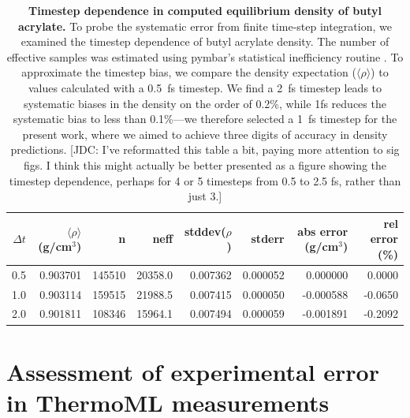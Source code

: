 \documentclass[aps,pre,twocolumn,nofootinbib,superscriptaddress,linenumbers]{revtex4-1}
\begin{document}
\begin{table}
\begin{tabular}{rrrrrrrr}
\toprule
$\Delta t$ &        $\langle \rho \rangle$  (g/cm$^3$) &       n &          neff &     stddev($\rho$) &    stderr &     abs error (g/cm$^3$) &    rel error (\%) \\
\midrule
0.5 &  0.903701 &  145510 &  20358.0 &  0.007362 &  0.000052 &  0.000000 &  0.0000 \\
1.0 &  0.903114 &  159515 &  21988.5 &  0.007415 &  0.000050 & -0.000588 & -0.0650 \\
2.0 &  0.901811 &  108346 &  15964.1 &  0.007494 &  0.000059 & -0.001891 & -0.2092 \\
\bottomrule
\end{tabular}
\caption{{\bf Timestep dependence in computed equilibrium density of butyl acrylate.}
To probe the systematic error from finite time-step integration, we examined the timestep dependence of butyl acrylate density.  
The number of effective samples was estimated using pymbar's statistical inefficiency routine \cite{shirts2008statistically}.  
To approximate the timestep bias, we compare the density expectation ($\langle \rho \rangle$) to values calculated with a 0.5~fs timestep.  
We find a 2~fs timestep leads to systematic biases in the density on the order of 0.2\%, while 1fs reduces the systematic bias to less than 0.1\%---we therefore selected a 1~fs timestep for the present work, where we aimed to achieve three digits of accuracy in density predictions.
{\color{red}[JDC: I've reformatted this table a bit, paying more attention to sig figs.  I think this might actually be better presented as a figure showing the timestep dependence, perhaps for 4 or 5 timesteps from 0.5 to 2.5 fs, rather than just 3.]}
}
\label{table:TimestepDependence}
\end{table}


\section{Assessment of experimental error in ThermoML measurements}
\label{section:experimental-error}

\end{document}
